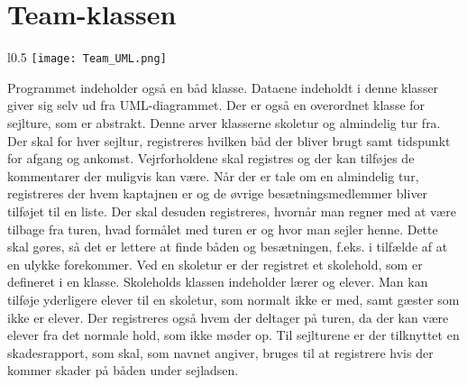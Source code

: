 \chapter{Team-klassen}
\begin{minipage}[t]{1\linewidth}
\begin{wrapfigure}{l}{0.5\textwidth}
\texttt{[image: Team\_UML.png]}
\end{wrapfigure}

Programmet indeholder også en båd klasse. Dataene indeholdt i denne klasser giver sig selv ud fra UML-diagrammet. Der er
også en overordnet klasse for sejlture, som er abstrakt. Denne arver klasserne skoletur og almindelig tur fra. Der skal
for hver sejltur, registreres hvilken båd der bliver brugt samt tidspunkt for afgang og ankomst. Vejrforholdene skal
registres og der kan tilføjes de kommentarer der muligvis kan være. Når der er tale om en almindelig tur, registreres
der hvem kaptajnen er og de øvrige besætningsmedlemmer bliver tilføjet til en liste. Der skal desuden registreres,
hvornår man regner med at være tilbage fra turen, hvad formålet med turen er og hvor man sejler henne. Dette skal
gøres, så det er lettere at finde båden og besætningen, f.eks. i tilfælde af at en ulykke forekommer.
Ved en skoletur er der registret et skolehold, som er defineret i en klasse. Skoleholds klassen indeholder lærer og
elever. Man kan tilføje yderligere elever til en skoletur, som normalt ikke er med, samt gæster som ikke er elever. Der
registreres også hvem der deltager på turen, da der kan være elever fra det normale hold, som ikke møder op. Til
sejlturene er der tilknyttet en skadesrapport, som skal, som navnet angiver, bruges til at registrere hvis der kommer
skader på båden under sejladsen. 

\end{minipage}